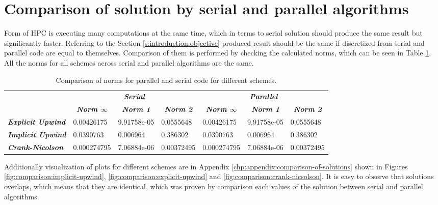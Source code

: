 \section{Comparison of solution by serial and parallel algorithms} \label{s:results:compare-solutions-serial-parallel}

	Form of \gls{HPC} is executing many computations at the same time, which in terms to serial solution should produce the same result but significantly faster. Referring to the Section \ref{s:introduction:objective} produced result should be the same if discretized from serial and parallel code are equal to themselves. Comparison of them is performed by checking the calculated norms, which can be seen in Table \ref{tab:comparison-serial-parallel}. All the norms for all schemes across serial and parallel algorithms are the same.
	\begin{table}[!htbp]
		\centering
		\caption{Comparison of norms for parallel and serial code for different schemes.}
		\label{tab:comparison-serial-parallel}
		\begin{tabular}{l|l|l|l|l|l|l|}
			\cline{2-7}
			& \multicolumn{3}{c|}{\textit{\textbf{Serial}}} & \multicolumn{3}{c|}{\textit{\textbf{Parallel}}} \\ \cline{2-7} 
			& \multicolumn{1}{c|}{\textit{\textbf{Norm $\infty$}}} & \multicolumn{1}{c|}{\textit{\textbf{Norm 1}}} & \multicolumn{1}{c|}{\textit{\textbf{Norm 2}}} & \multicolumn{1}{c|}{\textit{\textbf{Norm $\infty$}}} & \multicolumn{1}{c|}{\textit{\textbf{Norm 1}}} & \multicolumn{1}{c|}{\textit{\textbf{Norm 2}}} \\ \hline
			\multicolumn{1}{|l|}{\textit{\textbf{Explicit Upwind}}} & 0.00426175 & 9.91758e-05 & 0.0555648 & 0.00426175 & 9.91758e-05 & 0.0555648 \\ \hline
			\multicolumn{1}{|l|}{\textit{\textbf{Implicit Upwind}}} & 0.0390763 & 0.006964 & 0.386302 & 0.0390763 & 0.006964 & 0.386302 \\ \hline
			\multicolumn{1}{|l|}{\textit{\textbf{Crank-Nicolson}}} & 0.000274795 & 7.06884e-06 & 0.00372495 & 0.000274795 & 7.06884e-06 & 0.00372495 \\ \hline
		\end{tabular}
	\end{table}
	Additionally visualization of plots for different schemes are in Appendix \ref{chp:appendix:comparison-of-solutions} shown in Figures \ref{fig:comparison:implicit-upwind}, \ref{fig:comparison:explicit-upwind} and \ref{fig:comparison:crank-nicsolson}. It is easy to observe that solutions overlaps, which means that they are identical, which was proven by comparison each values of the solution between serial and parallel algorithms.
	
